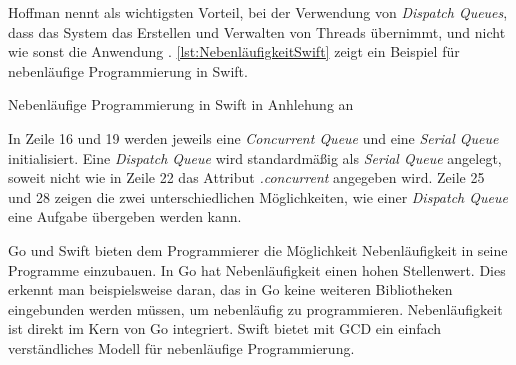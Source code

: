 Hoffman nennt als wichtigsten Vorteil, bei der Verwendung von \textit{Dispatch Queues}, dass das System das Erstellen und Verwalten von Threads übernimmt, und nicht wie sonst die Anwendung \cite[S.255]{Hoffman.2017}.
\autoref{lst:NebenläufigkeitSwift} zeigt ein Beispiel für nebenläufige Programmierung in Swift.

\begin{listing}[H]
\caption{Nebenläufige Programmierung in Swift in Anhlehung an \cite[S.255ff]{Hoffman.2017}}
\label{lst:NebenläufigkeitSwift}
\end{listing}

In Zeile 16 und 19 werden jeweils eine \textit{Concurrent Queue} und eine \textit{Serial Queue} initialisiert.
Eine \textit{Dispatch Queue} wird standardmäßig als \textit{Serial Queue} angelegt, soweit nicht wie in Zeile 22 das Attribut \textit{.concurrent} angegeben wird.
Zeile 25 und 28 zeigen die zwei unterschiedlichen Möglichkeiten, wie einer \textit{Dispatch Queue} eine Aufgabe übergeben werden kann.

Go und Swift bieten dem Programmierer die Möglichkeit Nebenläufigkeit in seine Programme einzubauen. 
In Go hat Nebenläufigkeit einen hohen Stellenwert. 
Dies erkennt man beispielsweise daran, das in Go keine weiteren Bibliotheken eingebunden werden müssen, um nebenläufig zu programmieren.
Nebenläufigkeit ist direkt im Kern von Go integriert.
Swift bietet mit GCD ein einfach verständliches Modell für nebenläufige Programmierung. 